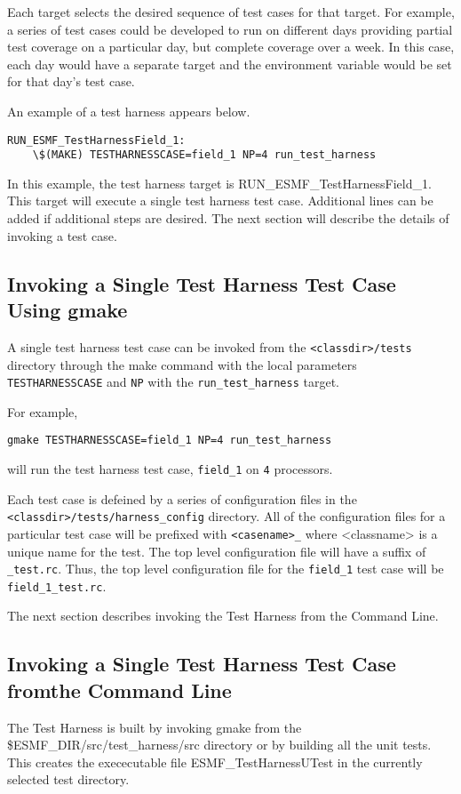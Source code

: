 Each target selects the desired sequence of test cases for that target.
For example, a series of test cases could be developed to run on different days providing partial
test coverage on a particular day, but complete coverage over a week.
In this case, each day would have a separate target and the environment variable would be set for
that day's test case.

An example of a test harness appears below.
\begin{verbatim}
RUN_ESMF_TestHarnessField_1:
	\$(MAKE) TESTHARNESSCASE=field_1 NP=4 run_test_harness
\end{verbatim}

In this example, the test harness target is RUN\_ESMF\_TestHarnessField\_1.  This target will execute a
single test harness test case. Additional lines can be added if additional steps are desired.
The next section will describe the details of invoking a test case.

\subsection{Invoking a Single Test Harness Test Case Using gmake}
A single test harness test case can be invoked from the \texttt{<classdir>/tests}
directory through the make command with the local parameters \texttt{TESTHARNESSCASE} and
\texttt{NP} with the \texttt{run\_test\_harness} target.

For example,
\begin{verbatim}
gmake TESTHARNESSCASE=field_1 NP=4 run_test_harness
\end{verbatim}
will run the test harness test case, \texttt{field\_1} on \texttt{4} processors.

Each test case is defeined by a series of configuration files in the
\texttt{<classdir>/tests/harness\_config} directory.  
All of the configuration files for a particular test case will be prefixed with 
\texttt{<casename>\_} where <classname> is a unique name for the test. 
The top level configuration file will have a suffix of \texttt{\_test.rc}.
Thus, the top level configuration file for the \texttt{field\_1} test case will be
\texttt{field\_1\_test.rc}.

The next section describes invoking the Test Harness from the Command Line.

\subsection{Invoking a Single Test Harness Test Case fromthe Command Line}
The Test Harness is built by invoking gmake from the \$ESMF\_DIR/src/test\_harness/src directory or 
by building all the unit tests. This creates the exececutable file ESMF\_TestHarnessUTest in 
the currently selected test directory.

